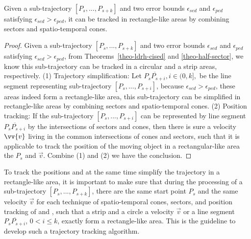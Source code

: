 
\begin{proposition}
	\label{theo-binary}
	Given a sub-trajectory $[P_s,...,P_{s+k}]$ and two error bounds $\epsilon_{sed}$ and $\epsilon_{ped}$ satisfying $\epsilon_{sed} > \epsilon_{ped}$, it can be tracked in rectangle-like areas by combining sectors and spatio-temporal cones.
\end{proposition}

\begin{proof}
Given a sub-trajectory $[P_s,...,P_{s+k}]$ and two error bounds $\epsilon_{sed}$ and $\epsilon_{ped}$ satisfying $\epsilon_{sed} > \epsilon_{ped}$, from Theorems~\ref{theo-ldrh-cised} and \ref{theo-half-sector}, we know this sub-trajectory can be tracked in a circular and a strip areas, respectively.  
%
(1) Trajectory simplification: Let $\overline{P_sP_{s+i}}, i\in (0,k],$ be the line segment representing sub-trajectory $[P_s,...,P_{s+i}]$, because $\epsilon_{sed} > \epsilon_{ped}$, these areas indeed form a rectangle-like area, \ie this sub-trajectory can be simplified in rectangle-like areas by combining sectors and spatio-temporal cones.
%
(2) Position tracking: If the sub-trajectory $[P_s,...,P_{s+i}]$ can be represented by line segment $\overline{P_sP_{s+i}}$ by the intersections of sectors and cones, then there is sure a velocity $\vv{v}$ living in the common intersections of cones and sectors, such that it is applicable to track the position of the moving object in a rectangular-like area \wrt the $P_s$ and $\vec{v}$. 
Combine (1) and (2) we have the conclusion.
\end{proof}


To track the positions and at the same time simplify the trajectory in a rectangle-like area, it is important to make sure that during the processing of a sub-trajectory $[P_s,...,P_{s+k}]$, there are the same start point $P_s$ and the same velocity $\vec{v}$ for each technique of spatio-temporal cones, sectors, and position tracking of \ped and \sed, such that a strip and a circle \wrt a velocity $\vec{v}$ or a line segment $\overline{P_sP_{s+i}}$, $0<i\le k$, exactly form a rectangle-like area. This is the guideline to develop such a trajectory tracking algorithm. 




